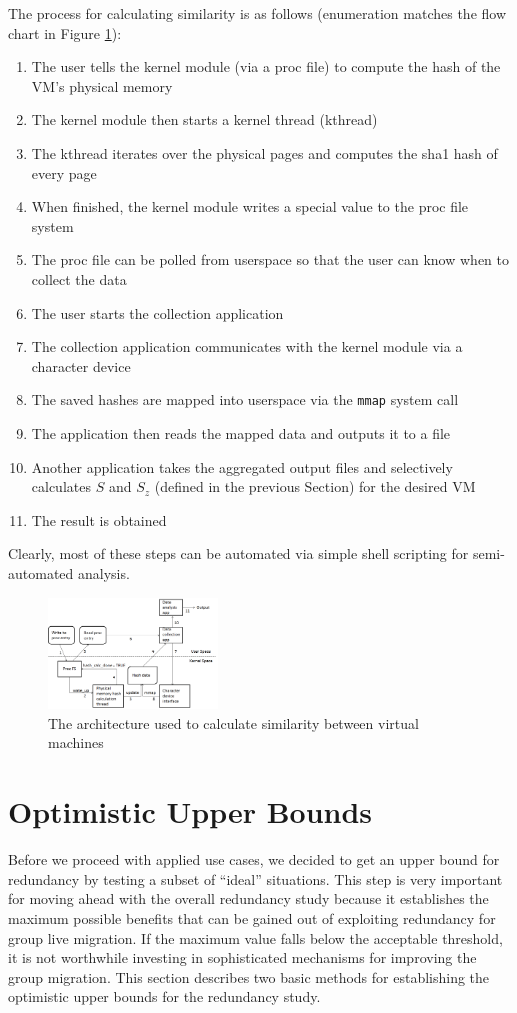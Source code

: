 \documentclass{acm_proc_article-sp}
\begin{document}
The process for calculating similarity is as follows (enumeration matches the flow chart in Figure \ref{fig:flow}):
\begin{enumerate}
  \item The user tells the kernel module (via a proc file)  to compute the hash of the VM's physical memory
  \item The kernel module then starts a kernel thread (kthread)
  \item The kthread iterates over the physical pages and computes the sha1 hash of every page
  \item When finished, the kernel module writes a special value to the proc file system
  \item The proc file can be polled from userspace so that the user can know when to collect the data
  \item The user starts the collection application
  \item The collection application communicates with the kernel module via a character device
  \item The saved hashes are mapped into userspace via the {\tt mmap} system call
  \item The application then reads the mapped data and outputs it to a file
  \item Another application takes the aggregated output files and selectively calculates $S$ and $S_z$ (defined in the previous Section) for the desired VM
  \item The result is obtained
\end{enumerate}
Clearly, most of these steps can be automated via simple shell scripting for semi-automated analysis.

\begin{figure}
  \centering
  \includegraphics[width=0.4\textwidth]{images/architecture.png}
  \caption{The architecture used to calculate similarity between virtual machines}\label{fig:flow}
\end{figure}

\section{Optimistic Upper Bounds}
Before we proceed with applied use cases, we decided to get an upper bound for redundancy by testing a subset of ``ideal'' situations. This step is very important for moving ahead with the overall redundancy study because it establishes the maximum possible benefits that can be gained out of exploiting redundancy for group live migration. If the maximum value falls below the acceptable threshold, it is not worthwhile investing in sophisticated mechanisms for improving the group migration. This section describes two basic methods for establishing the optimistic upper bounds for the redundancy study.
\end{document}
